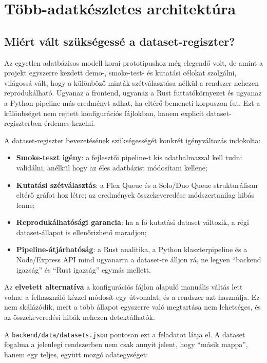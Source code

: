 ﻿\documentclass[a4paper,12pt]{report}
\begin{document}
\chapter{Több-adatkészletes architektúra}

\section{Miért vált szükségessé a dataset-regiszter?}

Az egyetlen adatbázisos modell korai prototípushoz még elegendő volt, de amint a projekt egyszerre kezdett demo-, smoke-test- és kutatási célokat szolgálni, világossá vált, hogy a különböző minták szétválasztása nélkül a rendszer nehezen reprodukálható. Ugyanaz a frontend, ugyanaz a Rust futtatókörnyezet és ugyanaz a Python pipeline más eredményt adhat, ha eltérő bemeneti korpuszon fut. Ezt a különbséget nem rejtett konfigurációs fájlokban, hanem explicit dataset-regiszterben érdemes kezelni.

A dataset-regiszter bevezetésének szükségességét konkrét igényváltozás indokolta:

\begin{itemize}
    \item \textbf{Smoke-teszt igény}: a fejlesztői pipeline-t kis adathalmazzal kell tudni validálni, anélkül hogy az éles adatbázist módosítani kellene;
    \item \textbf{Kutatási szétválasztás}: a Flex Queue és a Solo/Duo Queue strukturálisan eltérő gráfot hoz létre; az eredmények összekeveredése módszertanilag hibás lenne;
    \item \textbf{Reprodukálhatósági garancia}: ha a fő kutatási dataset változik, a régi dataset-állapot is ellenőrizhető maradjon;
    \item \textbf{Pipeline-átjárhatóság}: a Rust analitika, a Python klaszterpipeline és a Node/Express API mind ugyanarra a dataset-re álljon rá, ne legyen ``backend igazság'' és ``Rust igazság'' egymás mellett.
\end{itemize}

Az \textbf{elvetett alternatíva} a konfigurációs fájlon alapuló manuális váltás lett volna: a felhasználó kézzel módosít egy útvonalat, és a rendszer azt használja. Ez nem skálázódik, mert a több állapot egyszerre való megtartása nem lehetséges, és az összekeveredési hibák nehezen detektálhatók.

A \texttt{backend/data/datasets.json} pontosan ezt a feladatot látja el. A dataset fogalma a jelenlegi rendszerben nem csak annyit jelent, hogy ``másik mappa'', hanem egy teljes, együtt mozgó adategységet:
\end{document}
